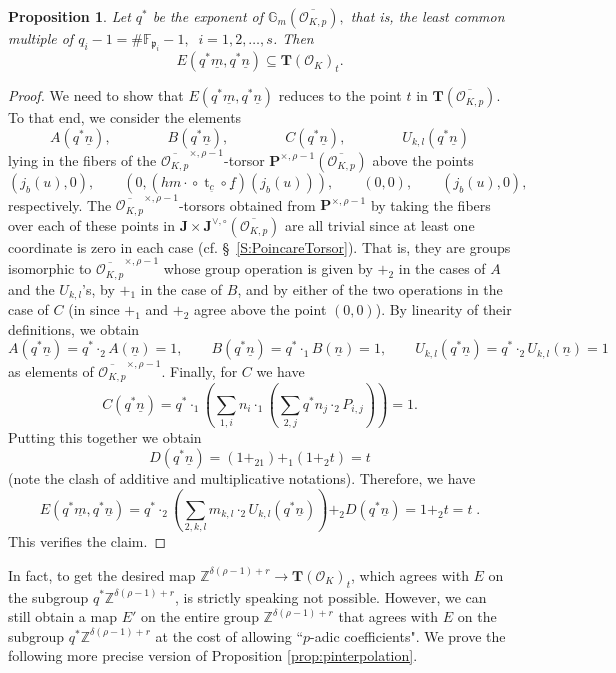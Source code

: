 \documentclass[11pt,oneside]{amsart}
\theoremstyle{plain}
\newtheorem{proposition}[theorem]{Proposition}
\theoremstyle{definition}
\def\G{{\bf G}}
\DeclareMathOperator{\tr}{t}
\def\TT{\mathbf{T}}
\def\Z{\mathbb{Z}}
\def\J{\mathbf{J}}
\def\Jo{\mathbf{J}^{\vee,\circ}}
\def\G{\mathbb{G}}
\def\P{\mathbf{P}}
\def\ra{\rightarrow}
\def\oh{\mathcal{O}}
\begin{document}
\begin{proposition}\label{prop:q-1-kills}
Let $q^*$ be the exponent of $\G_m(\overline{\oh_{K, p}}),$ that is, the least common multiple of $q_i-1=\# \mathbb{F}_{\mathfrak{p}_i}-1, \;\; i=1, 2, \dots, s$. Then 
$$E(q^*\underline{m}, q^*\underline{n})\subseteq \TT(\oh_K)_{t}.$$
\end{proposition}

\begin{proof}
We need to show that $E(q^*\underline{m}, q^*\underline{n})$ reduces to the point $t$ in $\TT(\overline{\oh_{K, p}})$. To that end, we consider the elements
$$A(q^*\underline{n}),
\qquad\qquad B(q^*\underline{n}),
\qquad\qquad C(q^*\underline{n}),
\qquad\qquad U_{k, l}(q^*\underline{n})$$
lying in the fibers of the $\overline{\oh_{K, p}}^{\times, \rho-1}$-torsor $\P^{\times, \rho-1}(\overline{\oh_{K, p}})$ above the points 
$$(j_b(u), 0),
\qquad(0, ({hm\cdot}\circ \tr_{\underline{c}}\circ \underline{f})(j_b(u))), 
\qquad (0, 0), 
\qquad (j_b(u), 0),$$
respectively. The $\overline{\oh_{K, p}}^{\times,\rho-1}$-torsors obtained from $\P^{\times, \rho-1}$ by taking the fibers over each of these points in $\J\times \Jo(\overline{\oh_{K, p}})$ are all trivial since at least one coordinate is zero in each case (cf. \S~\ref{S:PoincareTorsor}). That is, they are groups isomorphic to $\overline{\oh_{K, p}}^{\times, \rho-1}$ whose group operation is given by $+_2$ in the cases of $A$ and the $U_{k, l}$'s, by $+_1$ in the case of $B$, and by either of the two operations in the case of $C$ (in since $+_1$ and $+_2$ agree above the point $(0, 0)$). By linearity of their definitions, we obtain
$$A(q^*\underline{n})=q^{*}\cdot_2 A(\underline{n})=1,  \qquad B(q^*\underline{n})=q^{*}\cdot_1 B(\underline{n})=1, \qquad U_{k, l}(q^*\underline{n})=q^*\cdot_2U_{k, l}(\underline{n})=1 $$
as elements of $\overline{\oh_{K, p}}^{\times, \rho-1}.$ Finally, for $C$ we have
$$C(q^*\underline{n})=q^*\cdot_1\left({\sum}_{1, i}n_i \cdot_1 \left({\sum}_{2, j}q^*n_j\cdot_2 P_{i, j}\right)\right)=1.$$
Putting this together we obtain
$$D(q^*\underline{n})=(1+_21)+_1(1+_2t)=t$$ 
(note the clash of additive and multiplicative notations). Therefore, we have
$$E(q^*\underline{m}, q^*\underline{n})=q^* \cdot_2\left({\sum}_{2, k, l}m_{k, l}\cdot_2U_{k, l}(q^*\underline{n})\right)+_2 D(q^*\underline{n})=1+_2t=t\;.$$ 
This verifies the claim.\end{proof}

In fact, to get the desired map $\Z^{\delta(\rho - 1)+ r} \ra \TT(\oh_K)_t$, which agrees with $E$ on the subgroup $q^* \Z^{\delta(\rho - 1)+ r}$, is strictly speaking not possible. However, we  can still obtain a map $E'$ on the entire group $\Z^{\delta(\rho-1)+r}$ that agrees with $E$ on the subgroup $q^* \Z^{\delta(\rho - 1)+ r}$ at the cost of allowing ``$p$-adic coefficients". We prove the following more precise version of Proposition \ref{prop:pinterpolation}. 
\end{document}

